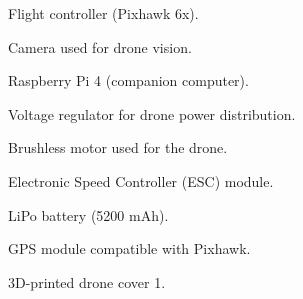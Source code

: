 \begin{figure}[H]
    \centering
    \caption{Flight controller (Pixhawk 6x).}
    \label{fig:pixhawk}
\end{figure}

\begin{figure}[H]
    \centering
    \caption{Camera used for drone vision.}
    \label{fig:camera}
\end{figure}

\begin{figure}[H]
    \centering
    \caption{Raspberry Pi 4 (companion computer).}
    \label{fig:rpi4}
\end{figure}

\begin{figure}[H]
    \centering
    \caption{Voltage regulator for drone power distribution.}
    \label{fig:voltage_regulator}
\end{figure}

\begin{figure}[H]
    \centering
    \caption{Brushless motor used for the drone.}
    \label{fig:brushless_motor}
\end{figure}

\begin{figure}[H]
    \centering
    \caption{Electronic Speed Controller (ESC) module.}
    \label{fig:esc_module}
\end{figure}

\begin{figure}[H]
    \centering
    \caption{LiPo battery (5200 mAh).}
    \label{fig:lipo_battery}
\end{figure}

\begin{figure}[H]
    \centering
    \caption{GPS module compatible with Pixhawk.}
    \label{fig:gps_module}
\end{figure}

\begin{figure}[H]
    \centering
    \caption{3D-printed drone cover 1.}
    \label{fig:drone_cover_1}
\end{figure}

